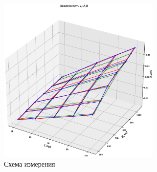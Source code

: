 \documentclass{article}
\begin{document}
\begin{figure}[h]
    \begin{center}
        \includegraphics[width=0.72\textwidth]{plot_IUB.eps}
    \end{center}
    \caption{Схема измерения}
    \label{IUB}
\end{figure}

\newpage
\end{document}
